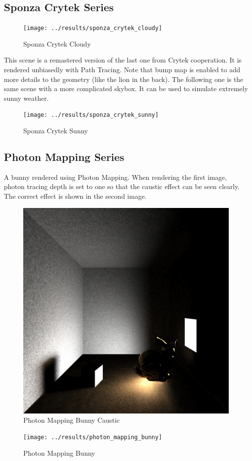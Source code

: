 \documentclass[utf8]{article}
\begin{document}
\subsection{Sponza Crytek Series}
\begin{figure}[H]
	\centering
	\texttt{[image: ../results/sponza\_crytek\_cloudy]}
	\caption{Sponza Crytek Cloudy}
	\label{fig:sponzacrytekcloudy}
\end{figure}
This scene is a remastered version of the last one from Crytek cooperation. It is rendered unbiasedly with Path Tracing. Note that bump map is enabled to add more details to the geometry (like the lion in the back). The following one is the same scene with a more complicated skybox. It can be used to simulate extremely sunny weather.

\begin{figure}[H]
	\centering
	\texttt{[image: ../results/sponza\_crytek\_sunny]}
	\caption{Sponza Crytek Sunny}
	\label{fig:sponzacryteksunny}
\end{figure}


\subsection{Photon Mapping Series}
A bunny rendered using Photon Mapping. When rendering the first image, photon tracing depth is set to one so that the caustic effect can be seen clearly. The correct effect is shown in the second image.

\begin{figure}[H]
	\centering
	\includegraphics[width=0.5\linewidth]{../results/photon_mapping_bunny_caustic}
	\caption{Photon Mapping Bunny Caustic}
	\label{fig:photonmappingbunnycaustic}
\end{figure}

\begin{figure}[H]
	\centering
	\texttt{[image: ../results/photon\_mapping\_bunny]}
	\caption{Photon Mapping Bunny}
	\label{fig:photonmappingbunny}
\end{figure}
\end{document}
